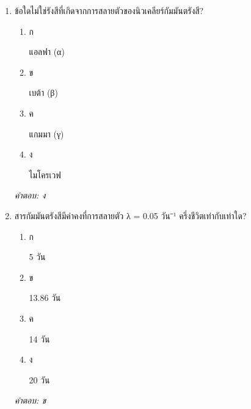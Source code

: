\documentclass[12pt]{article}
\begin{document}
\begin{enumerate}[label=\arabic*., itemsep=0.5\baselineskip, topsep=0.5\baselineskip, leftmargin=*]
\item ข้อใดไม่ใช่รังสีที่เกิดจากการสลายตัวของนิวเคลียร์กัมมันตรังสี?
\begin{enumerate}[label=\alph*)., itemsep=0.3\baselineskip, topsep=0.3\baselineskip]
\item ก\ 
\begin{minipage}[t]{0.9\linewidth}
\raggedright แอลฟา (α)
\end{minipage}
\item ข\ 
\begin{minipage}[t]{0.9\linewidth}
\raggedright เบต้า (β)
\end{minipage}
\item ค\ 
\begin{minipage}[t]{0.9\linewidth}
\raggedright แกมมา (γ)
\end{minipage}
\item ง\ 
\begin{minipage}[t]{0.9\linewidth}
\raggedright ไมโครเวฟ
\end{minipage}
\end{enumerate}
\vspace{-0.3\baselineskip}
\begin{small}
\textit{คำตอบ: ง}
\end{small}

\item สารกัมมันตรังสีมีค่าคงที่การสลายตัว λ = 0.05 วัน⁻¹ ครึ่งชีวิตเท่ากับเท่าใด?
\begin{enumerate}[label=\alph*)., itemsep=0.3\baselineskip, topsep=0.3\baselineskip]
\item ก\ 
\begin{minipage}[t]{0.9\linewidth}
\raggedright 5 วัน
\end{minipage}
\item ข\ 
\begin{minipage}[t]{0.9\linewidth}
\raggedright 13.86 วัน
\end{minipage}
\item ค\ 
\begin{minipage}[t]{0.9\linewidth}
\raggedright 14 วัน
\end{minipage}
\item ง\ 
\begin{minipage}[t]{0.9\linewidth}
\raggedright 20 วัน
\end{minipage}
\end{enumerate}
\vspace{-0.3\baselineskip}
\begin{small}
\textit{คำตอบ: ข}
\end{small}


\end{enumerate}
\end{document}
